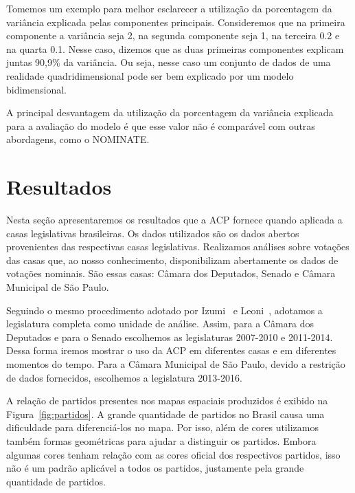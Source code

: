 \documentclass[a4paper, 12pt]{article}
\newcommand\nominate{NOMINATE\xspace}
\begin{document}
Tomemos um exemplo para melhor esclarecer a utilização da porcentagem da variância explicada pelas componentes principais. Consideremos que na primeira componente a variância seja 2, na segunda componente seja 1, na terceira 0.2 e na quarta 0.1. Nesse caso, dizemos que as duas primeiras componentes explicam juntas 90,9\% da variância. Ou seja, nesse caso um conjunto de dados de uma realidade quadridimensional pode ser bem explicado por um modelo bidimensional.

A principal desvantagem da utilização da porcentagem da variância explicada para a avaliação do modelo é que esse valor não é comparável com outras abordagens, como o \nominate.

\section{Resultados}
\label{sec:resultados}

Nesta seção apresentaremos os resultados que a ACP fornece quando aplicada a casas legislativas brasileiras. Os dados utilizados são os dados abertos provenientes das respectivas casas legislativas. Realizamos análises sobre votações das casas que, ao nosso conhecimento, disponibilizam abertamente os dados de votações nominais. São essas casas: Câmara dos Deputados, Senado e Câmara Municipal de São Paulo.

Seguindo o mesmo procedimento adotado por Izumi~\cite{izumi2016senado} e Leoni~\cite{leoni02cdep}, adotamos a legislatura completa como unidade de análise. Assim, para a Câmara dos Deputados e para o Senado escolhemos as legislaturas 2007-2010 e 2011-2014. Dessa forma iremos mostrar o uso da ACP em diferentes casas e em diferentes momentos do tempo. Para a Câmara Municipal de São Paulo, devido a restrição de dados fornecidos, escolhemos a legislatura 2013-2016. 

A relação de partidos presentes nos mapas espaciais produzidos é exibido na Figura~\ref{fig:partidos}. A grande quantidade de partidos no Brasil causa uma dificuldade para diferenciá-los no mapa. Por isso, além de cores utilizamos também formas geométricas para ajudar a distinguir os partidos. Embora algumas cores tenham relação com as cores oficial dos respectivos partidos, isso não é um padrão aplicável a todos os partidos, justamente pela grande quantidade de partidos.
\end{document}
